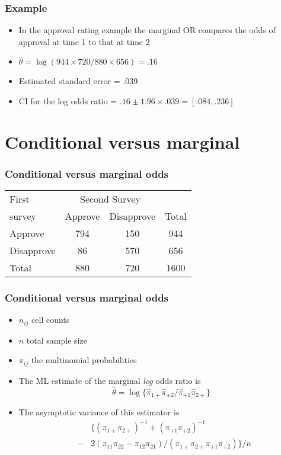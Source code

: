 \documentclass[aspectratio=169]{beamer}
\begin{document}
\begin{frame}\frametitle{Example}
\begin{itemize}
\item In the approval rating example the marginal OR compares
the odds of approval at time 1 to that at time 2
\item $\hat \theta = \log(944\times 720 / 880 \times 656) = .16$
\item Estimated standard error = $.039$
\item CI for the log odds ratio = $.16 \pm 1.96 \times .039 = [.084, .236]$
\end{itemize}
\end{frame}

\section{Conditional versus marginal}
\begin{frame}\frametitle{Conditional versus marginal odds}
\begin{center}
\ttfamily
  \begin{tabular}{lccc}
First & \multicolumn{2}{c}{Second Survey} & \\ \cline{2-3}
survey & Approve & Disapprove & Total \\ \hline
Approve & 794 & 150 & 944 \\
Disapprove & 86 & 570 & 656 \\
Total & 880 & 720 & 1600 \\ \hline
  \end{tabular}
\normalfont
\end{center}
\end{frame}

\begin{frame}\frametitle{Conditional versus marginal odds}
\begin{itemize}
\item $n_{ij}$ cell counts 
\item $n$ total sample size
\item $\pi_{ij}$ the multinomial probabilities
\item The ML estimate of the marginal {\em log} odds ratio is
$$\hat \theta = \log\{\hat \pi_{1+} \hat \pi_{+2}/ \hat \pi_{+1} \hat \pi_{2+}\}$$
\item The asymptotic variance of this estimator is
  \begin{eqnarray*}
&   & \{ (\pi_{1+}\pi_{2+})^{-1} + (\pi_{+1}\pi_{+2})^{-1} \\
& - & 2(\pi_{11}\pi_{22} - \pi_{12}\pi_{21})/ (\pi_{1+}\pi_{2+}\pi_{+1}\pi_{+2})\}/n
  \end{eqnarray*}
\end{itemize}
\end{frame}
\end{document}
